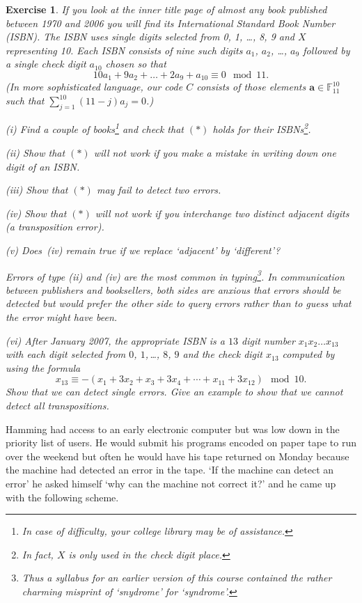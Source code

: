 \documentclass[12pt,a4paper]{article}
\theoremstyle{plain}
\newtheorem{exercise}[theorem]{Exercise}
\theoremstyle{definition}
\begin{document}
\begin{exercise}\label{ISBN}
If you look
at the inner
title page of almost any book published between
1970 and 2006
you will find its International Standard
Book Number (ISBN). The ISBN
uses single digits selected from 0, 1, \dots, 8, 9
and $X$ representing 10. Each ISBN consists
of nine such digits $a_{1}$, $a_{2}$, \dots, $a_{9}$
followed by a single check digit $a_{10}$ chosen
so that
\begin{equation*}
10a_{1}+9a_{2}+ \dots+2a_{9}+a_{10}\equiv 0\mod{11}.\tag*{(*)}
\end{equation*}
(In more sophisticated language, our code $C$ consists
of those elements ${\mathbf a}\in {\mathbb F}_{11}^{10}$
such that $\sum_{j=1}^{10}(11-j)a_{j}=0$.)

(i) Find a couple of books\footnote{In case of difficulty,
your college library may be of assistance.}
and check that $(*)$ holds for their ISBNs\footnote{In fact,
$X$ is only used in the check digit place.}.

(ii) Show that $(*)$ will not work if you make a mistake
in writing down one digit of an ISBN.

(iii) Show that
$(*)$ may fail to detect two errors.

(iv) Show that $(*)$ will not work if you interchange
two distinct adjacent digits (a transposition error).

(v) Does~(iv) remain true if we replace `adjacent'
by `different'?

\noindent Errors of type (ii) and (iv) are the most common
in typing\footnote{Thus a syllabus for an 
earlier version of this
course contained the rather charming misprint
of `snydrome' for `syndrome'.}.
In communication between publishers and booksellers,
both sides are anxious that errors should be detected
but would prefer the other side to query errors
rather than to guess what the error might have been.

(vi) After January 2007, the appropriate ISBN is a $13$ digit number
$x_{1}x_{2}\dots x_{13}$ with each digit 
selected from $0$, $1$,\,\dots, $8$, $9$ and
the check digit $x_{13}$ computed by using the formula
\[x_{13}\equiv -(x_{1}+3x_{2}+x_{3}+3x_{4}+\cdots+x_{11}+ 3x_{12}) 
\mod{10}.\]
Show that we can detect single errors. Give an example
to show that we cannot detect all transpositions.
\end{exercise}

Hamming had access to an early electronic computer
but was low down in the priority list of users.
He would submit his
programs encoded on paper tape to run over the
weekend but often he would have his tape returned
on Monday because the machine had detected an error
in the tape. `If the machine can detect an error'
he asked himself `why can the machine not correct it?'
and he came up with the following scheme.
\end{document}

